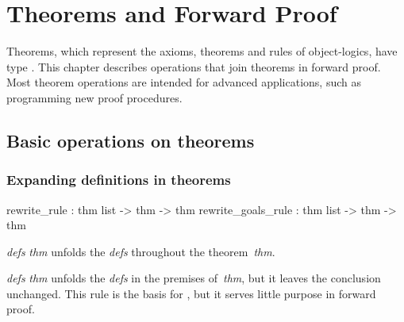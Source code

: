 
\chapter{Theorems and Forward Proof}

Theorems, which represent the axioms, theorems and rules of
object-logics, have type .  This chapter describes
operations that join theorems in forward proof.  Most theorem
operations are intended for advanced applications, such as programming
new proof procedures.


\section{Basic operations on theorems}

\subsection{Expanding definitions in theorems}
\begin{ttbox} 
rewrite_rule       : thm list -> thm -> thm
rewrite_goals_rule : thm list -> thm -> thm
\end{ttbox}
\begin{ttdescription}
\item[\ttindexbold{rewrite_rule} {\it defs} {\it thm}]  
unfolds the {\it defs} throughout the theorem~{\it thm}.

\item[\ttindexbold{rewrite_goals_rule} {\it defs} {\it thm}]  
unfolds the {\it defs} in the premises of~{\it thm}, but it leaves the
conclusion unchanged.  This rule is the basis for ,
but it serves little purpose in forward proof.
\end{ttdescription}


